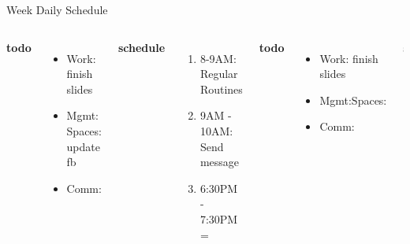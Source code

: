 \begin{frame}
\begin{columns}
\begin{column}{0.50\linewidth}
\begin{block}{Week Daily Schedule}
{\begin{columns}
          \textbf{\small todo} \\
          \begin{itemize}
            \tiny \item \tiny Work: finish slides   
          \item \tiny Mgmt: Spaces: update fb 
          \item \tiny Comm: 
          \end{itemize}
          \textbf{\small schedule} \\
          \begin{enumerate}
            \tiny \item \tiny 8-9AM: Regular Routines 
          \item \tiny 9AM - 10AM: Send message 
            \item \tiny 6:30PM - 7:30PM = 
          \end{enumerate} 
          \textbf{\small todo}\\
          \begin{itemize}  
            \tiny \item \tiny Work: finish slides 
            \item \tiny Mgmt:Spaces: 
            \item \tiny Comm: 

          \end{itemize} 

          \textbf{\small schedule}\\
          \begin{enumerate} 
            \tiny \item \tiny 8-9AM = Regular Routines 
            \item \tiny 12-1PM = 
            \item \tiny 3:30PM - 4:30PM = group meeting 
            \item \tiny 6PM - 9PM = revise emot. int. chapter and
              structure wl-cheat based on it 
          \end{enumerate} 
          
          \textbf{\small todo}\\ 
          \begin{itemize}
            \tiny \item \tiny Work: updates on GPU \dl{} \te{} \prio{}


\end{itemize}
\end{columns}}
\end{block}
\end{column}
\end{columns}
\end{frame}
